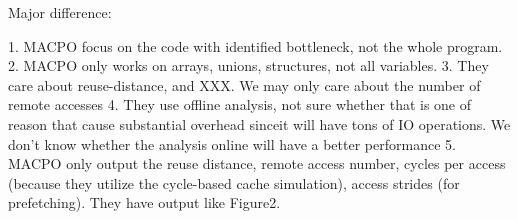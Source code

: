 Major difference:

1. MACPO focus on the code with identified bottleneck, not the whole program.
2. MACPO only works on arrays, unions, structures, not all variables. 
3. They care about reuse-distance, and XXX. We may only care about the number of remote accesses
4. They use offline analysis, not sure whether that is one of reason that cause substantial overhead sinceit will have tons of IO operations. We don't know whether the analysis online will have a better performance
5. MACPO only output the reuse distance, remote access number, cycles per access (because they utilize the cycle-based cache simulation), access strides (for prefetching). They have output like Figure2. 
